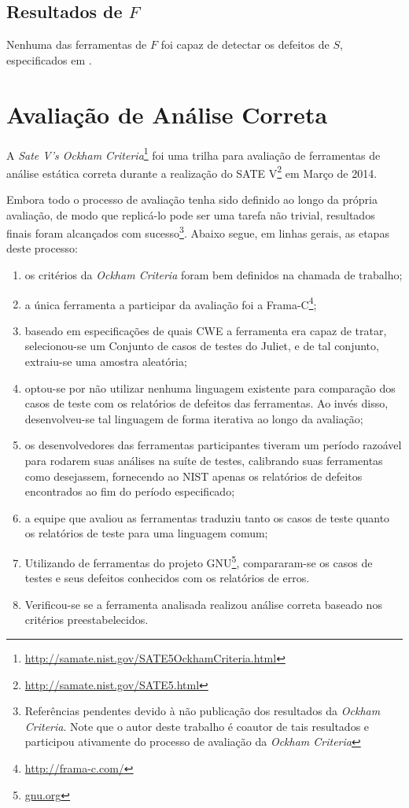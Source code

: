 \subsection{Resultados de $F$}

Nenhuma das ferramentas de $F$ foi capaz de detectar os defeitos de $S$, especificados em .

\section{Avaliação de Análise Correta}

A \textit{Sate V's Ockham Criteria}\footnote{\url{http://samate.nist.gov/SATE5OckhamCriteria.html}} foi uma trilha para avaliação de ferramentas de análise estática correta durante a realização do SATE V\footnote{\url{http://samate.nist.gov/SATE5.html}} em Março de 2014.

Embora todo o processo de avaliação tenha sido definido ao longo da própria avaliação, de modo que replicá-lo pode ser uma tarefa não trivial, resultados finais foram alcançados com sucesso\footnote{Referências pendentes devido à não publicação dos resultados da \textit{Ockham Criteria}. Note que o autor deste trabalho é coautor de tais resultados e participou ativamente do processo de avaliação da \textit{Ockham Criteria}}. Abaixo segue, em linhas gerais, as etapas deste processo:
\begin{enumerate}
  \item os critérios da \textit{Ockham Criteria} foram bem definidos na chamada de trabalho;
    \item a única ferramenta a participar da avaliação foi a Frama-C\footnote{\url{http://frama-c.com/}};
    \item baseado em especificações de quais CWE a ferramenta era capaz de tratar, selecionou-se um Conjunto de casos de testes do Juliet, e de tal conjunto, extraiu-se uma amostra aleatória;
    \item optou-se por não utilizar nenhuma linguagem existente para comparação dos casos de teste com os relatórios de defeitos das ferramentas. Ao invés disso, desenvolveu-se tal linguagem de forma iterativa ao longo da avaliação;
    \item os desenvolvedores das ferramentas participantes tiveram um período razoável para rodarem suas análises na suíte de testes, calibrando suas ferramentas como desejassem, fornecendo ao NIST apenas os relatórios de defeitos encontrados ao fim do período especificado;
    \item a equipe que avaliou as ferramentas traduziu tanto os casos de teste quanto os relatórios de teste para uma linguagem comum;
    \item Utilizando de ferramentas do projeto GNU\footnote{\url{gnu.org}}, compararam-se os casos de testes e seus defeitos conhecidos com os relatórios de erros.
    \item Verificou-se se a ferramenta analisada realizou análise correta baseado nos critérios preestabelecidos.
\end{enumerate}

